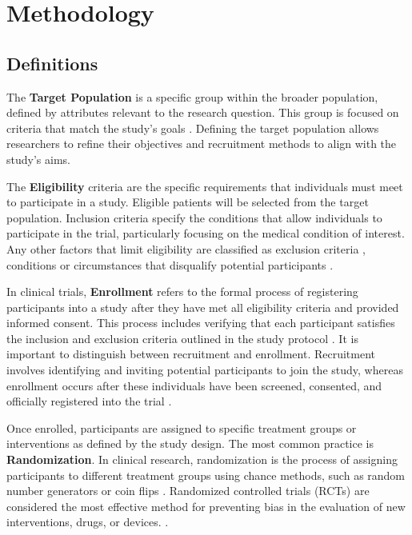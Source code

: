 








\chapter{Methodology} 

\section{Definitions}

The \textbf{Target Population} is a specific group within the broader population, defined by attributes relevant to the research question. This group is focused on criteria that match the study's goals \citep{willie2024population}. Defining the target population allows researchers to refine their objectives and recruitment methods to align with the study's aims.


The \textbf{Eligibility} criteria are the specific requirements that individuals must meet to participate in a study. Eligible patients will be selected from the target population. Inclusion criteria specify the conditions that allow individuals to participate in the trial, particularly focusing on the medical condition of interest. Any other factors that limit eligibility are classified as exclusion criteria \citep{van2007eligibility}, conditions or circumstances that disqualify potential participants \citep{food2018evaluating}.


In clinical trials, \textbf{Enrollment} refers to the formal process of registering participants into a study after they have met all eligibility criteria and provided informed consent. This process includes verifying that each participant satisfies the inclusion and exclusion criteria outlined in the study protocol \citep{NIH2021}. It is important to distinguish between recruitment and enrollment. Recruitment involves identifying and inviting potential participants to join the study, whereas enrollment occurs after these individuals have been screened, consented, and officially registered into the trial \citep{frank2004current}. 

Once enrolled, participants are assigned to specific treatment groups or interventions as defined by the study design. The most common practice is \textbf{Randomization}. In clinical research, randomization is the process of assigning participants to different treatment groups using chance methods, such as random number generators or coin flips \citep{lim2019randomization}. Randomized controlled trials (RCTs) are considered the most effective method for preventing bias in the evaluation of new interventions, drugs, or devices. \citep{van2007eligibility}.


